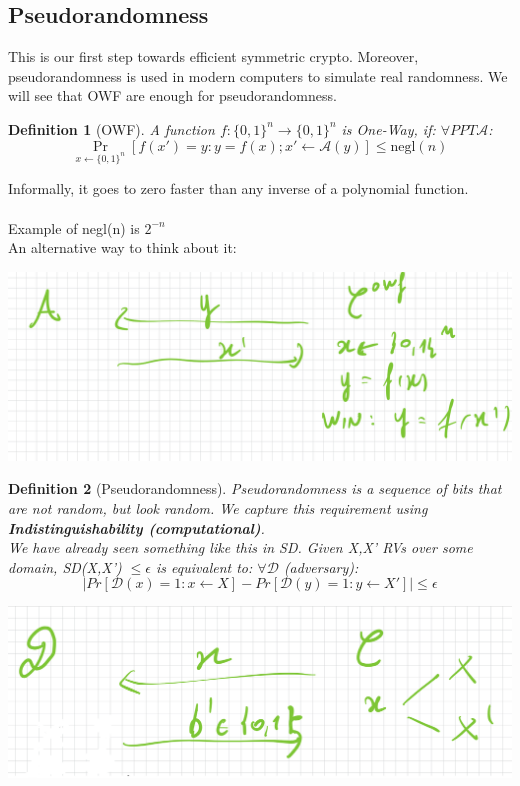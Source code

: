 \documentclass[11pt, a4paper]{article}
\newtheorem{defn}{Definition}
\begin{document}
\subsection{Pseudorandomness}
This is our first step towards efficient symmetric crypto. Moreover, pseudorandomness is used in modern computers to simulate real randomness. We will see that OWF are enough for pseudorandomness.\\
\begin{defn}[OWF]
    A function $f :\{0,1\}^n \rightarrow \{0,1\}^n$ is One-Way, if: $\forall PPT \mathcal{A}$:
    $$\Pr_{x \leftarrow\{0,1\}^n}[f(x')= y : y = f(x); x' \leftarrow \mathcal{A}(y)] \leq \text{negl}(n)$$
\end{defn}
Informally, it goes to zero faster than any inverse of a polynomial function.\\\\
Example of negl(n) is $2^{-n}$\\
An alternative way to think about it:
\begin{center}
    \includegraphics[scale=0.4]{img/Comp_sec/Alternative1.png}
\end{center}
\begin{defn}[Pseudorandomness]
    Pseudorandomness is a sequence of bits that are not random, but look random. We capture this requirement using \textbf{Indistinguishability (computational)}.\\
    We have already seen something like this in SD. Given X,X' RVs over some domain, SD(X,X') $\leq \epsilon$ is equivalent to: $\forall \mathcal{D}$ (adversary):
    $$|Pr[\mathcal{D}(x)=1 : x \leftarrow X] - Pr[\mathcal{D}(y)=1 : y \leftarrow X']| \leq \epsilon$$ 
\end{defn}
\begin{center}
    \includegraphics[scale=0.4]{img/Comp_sec/Alt2.png}
\end{center}
\end{document}
